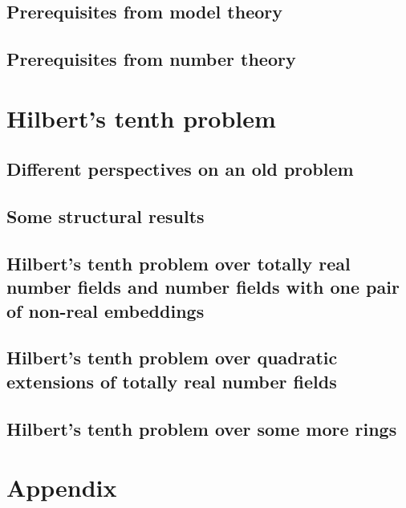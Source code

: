 \documentclass[12pt,a4paper]{scrbook}
\numberwithin{equation}{section}
\begin{document}
\section{Prerequisites from model theory}\label{sec:model theory}


\section{Prerequisites from number theory}\label{sec:number theory}


\chapter{Hilbert's tenth problem}

\section{Different perspectives on an old problem}


\section{Some structural results}


\section[\textsc{H10} over totally real number fields or fields with one  pair of conjugate embeddings]{Hilbert's tenth problem over totally real number fields and number fields with one pair of non-real embeddings}


\section{Hilbert's tenth problem over quadratic extensions of totally real number fields}


\section{Hilbert's tenth problem over some more rings}


\clearpage
\appendix


\chapter{Appendix}\label{sec:Appendix}


\backmatter
\vspace{\fill}
\printbibliography

\listoftodos
\end{document}
